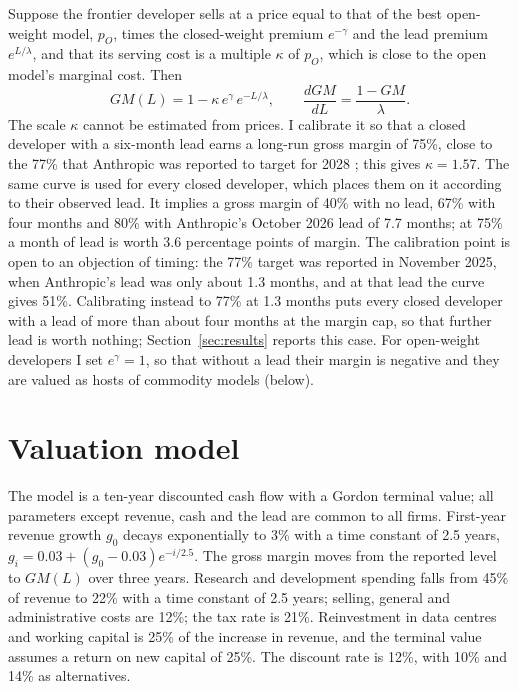 \documentclass[12pt]{article}
\begin{document}
Suppose the frontier developer sells at a price equal to that of the best open-weight model, $p_O$, times the closed-weight premium $e^{-\gamma}$ and the lead premium $e^{L/\lambda}$, and that its serving cost is a multiple $\kappa$ of $p_O$, which is close to the open model's marginal cost. Then
\begin{equation}
GM(L) = 1 - \kappa\, e^{\gamma}\, e^{-L/\lambda}, \qquad \frac{dGM}{dL} = \frac{1 - GM}{\lambda}.
\label{eq:gm}
\end{equation}
The scale $\kappa$ cannot be estimated from prices. I calibrate it so that a closed developer with a six-month lead earns a long-run gross margin of 75\%, close to the 77\% that Anthropic was reported to target for 2028 \citep{techcrunch2025anthropic}; this gives $\kappa = 1.57$. The same curve is used for every closed developer, which places them on it according to their observed lead. It implies a gross margin of 40\% with no lead, 67\% with four months and 80\% with Anthropic's October 2026 lead of 7.7 months; at 75\% a month of lead is worth 3.6 percentage points of margin. The calibration point is open to an objection of timing: the 77\% target was reported in November 2025, when Anthropic's lead was only about 1.3 months, and at that lead the curve gives 51\%. Calibrating instead to 77\% at 1.3 months puts every closed developer with a lead of more than about four months at the margin cap, so that further lead is worth nothing; Section~\ref{sec:results} reports this case. For open-weight developers I set $e^{\gamma} = 1$, so that without a lead their margin is negative and they are valued as hosts of commodity models (below).

\section{Valuation model}\label{sec:model}

The model is a ten-year discounted cash flow with a Gordon terminal value; all parameters except revenue, cash and the lead are common to all firms. First-year revenue growth $g_0$ decays exponentially to 3\% with a time constant of 2.5 years, $g_i = 0.03 + (g_0 - 0.03)e^{-i/2.5}$. The gross margin moves from the reported level to $GM(L)$ over three years. Research and development spending falls from 45\% of revenue to 22\% with a time constant of 2.5 years; selling, general and administrative costs are 12\%; the tax rate is 21\%. Reinvestment in data centres and working capital is 25\% of the increase in revenue, and the terminal value assumes a return on new capital of 25\%. The discount rate is 12\%, with 10\% and 14\% as alternatives.
\end{document}
